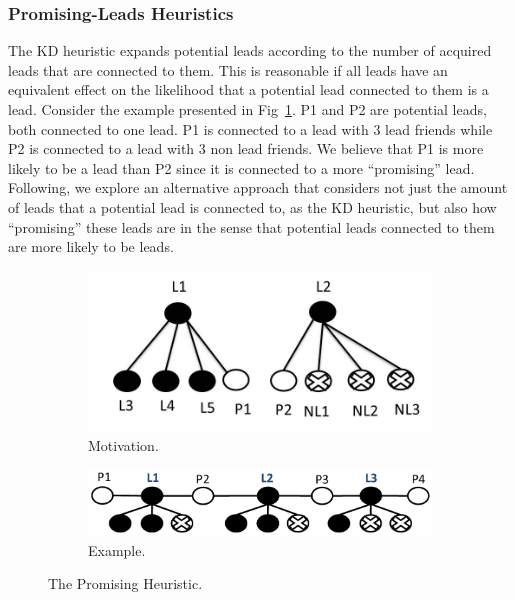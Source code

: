 \documentclass[prodmode,acmtecs]{acmsmall} %
\newcommand{\note}[2]{\textbf{\textsc{#1} says: \textit{#2}}}
\begin{document}
\subsubsection{Promising-Leads Heuristics}
\label{sec:promising}

The KD heuristic expands potential leads according to the number of acquired leads that are connected to them. This is reasonable if all leads have an equivalent effect on the likelihood that a potential lead connected to them is a lead.
Consider the example presented in Fig~\ref{fig:PromiseMotivation}. P1 and P2 are potential leads, both connected to one lead. P1 is connected to a lead with 3 lead friends while P2 is connected to a lead with 3 non lead friends. 
We believe that P1 is more likely to be a lead than P2 since it is connected to a more ``promising'' lead.
 Following, we explore an alternative approach that considers not just the amount of leads that a potential lead is connected to, as the KD heuristic, but also how ``promising'' these leads are %
 in the sense that potential leads connected to them are more likely to be leads. 

\begin{figure}
\centering
\begin{subfigure}{0.35\linewidth}
  \centering
  \includegraphics[width=\linewidth]{PromiseMotivation.jpg}
   \caption{Motivation.}\label{fig:PromiseMotivation}
\end{subfigure}
\begin{subfigure}{0.55\linewidth}
  \centering
  \includegraphics[width=\linewidth]{bysp-good_cropped.pdf}
   \caption{Example.}\label{fig:Promising}
\end{subfigure}
\caption{The Promising Heuristic.}
\end{figure}
\end{document}
